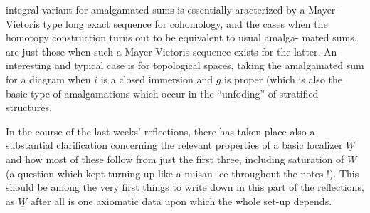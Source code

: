 
integral variant for amalgamated sums is essentially aracterized by a
Mayer-Vietoris type long exact sequence for cohomology,  and the cases
when the homotopy construction turns out to be equivalent to usual amalga-%
mated sums,  are  just those when such a Mayer-Vietoris sequence exists
for the latter.  An interesting and typical case is for topological spaces,
taking the amalgamated sum for a diagram
when $i$ is a closed immersion and $g$ is proper  (which is also the basic type
of amalgamations which occur in the ``unfoding'' of stratified structures\hand{)}.

In the course of the last weeks' reflections,  there has taken place
also a substantial clarification concerning the relevant properties of a
basic localizer $\underline{W}$ and how most of these\hand{,} follow from just the first three,\hand{$\swarrow$}
including \inserted[typed]{\hand{\uline{\textcolor{black}{strong}}}} saturation of $\underline{W}$\hand{,} (a question which kept turning up like a nuisan-%
ce throughout the notes !).  This should be among the very first things to
write down in this part of the reflections,  as $\underline{W}$ after all is \hand{\uline{\textcolor{black}{the}}} one
axiomatic data upon which the whole set-up depends.

